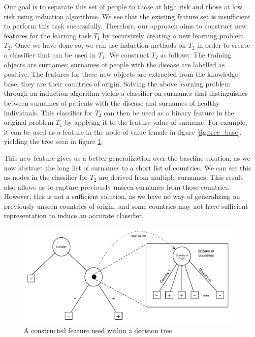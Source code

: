 \documentclass[twoside,11pt]{article}
\theoremstyle{definition}
\begin{document}
 Our goal is to separate this set of people to those at high risk and those at low risk using induction algorithms. We see that the existing feature set is insufficient to perform this task successfully. Therefore, our approach aims to construct new features for the learning task $T_1$ by recursively creating a new learning problem $T_2$. Once we have done so, we can use induction methods on $T_2$ in order to create a classifier that can be used in $T_1$. We construct $T_2$ as follows: 
  The training objects are surnames; surnames of people with the disease are labelled as positive. The features for these new objects are extracted from the knowledge base, they are their countries of origin.
Solving the above learning problem through an induction algorithm yields a classifier on surnames that distinguishes between surnames of patients with the disease and surnames of healthy individuals. This classifier for $T_2$ can then be used as a binary feature in the original problem $T_1$ by applying it to the feature value of surname. For example, it can be used as a feature in the node of value female in figure \ref{fig:tree_base}, yielding the tree seen in figure \ref{fig:lvl1_tree}. 

This new feature gives us a better generalization over the baseline solution, as we now abstract the long list of surnames to a short list of countries. We can see this as nodes in the classifier for $T_2$ are derived from multiple surnames. This result also allows us to capture previously unseen surnames from those countries. However, this is not a sufficient solution, as we have no way of generalizing on previously unseen countries of origin, and some countries may not have sufficient representation to induce an accurate classifier. %


\begin{figure}
	\centering
	\includegraphics[width=\linewidth]{fig2.pdf}
	\caption{A constructed feature used within a decision tree}
	\label{fig:lvl1_tree}
\end{figure}
\end{document}
